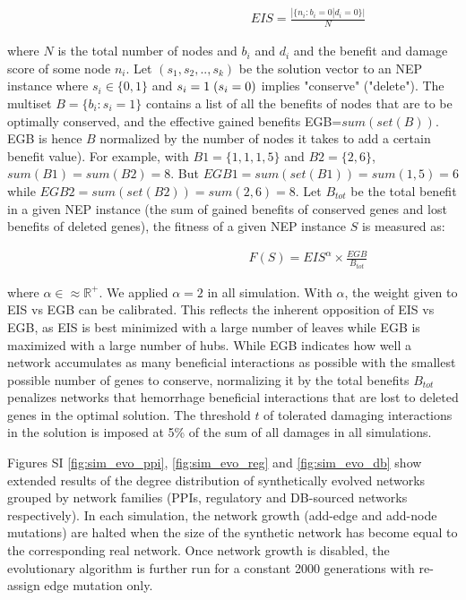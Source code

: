 \documentclass[12pt]{article}	%
\newcommand{\mys }{\hspace{0.1cm}}
\begin{document}
        \begin{align}
            \qquad\qquad\qquad\qquad\qquad\qquad EIS=\frac{|\{n_i:b_i=0|d_i=0\}|}{N}
        \end{align}


    \vspace{3mm}\noindent where $N$ is the total number of nodes and $b_i$ and $d_i$ and the benefit and damage score of some node $n_i$. Let $(s_1, s_2, .., s_k)$ be the solution vector to an NEP instance where $s_i\in\{0,1\}$  and $s_i=1 \mys (s_i=0)$ implies "conserve" ("delete"). The multiset $B=\{b_i: s_i=1\}$ contains a list of all the benefits of nodes that are to be optimally conserved, and the  effective gained benefits EGB=$sum(set(B))$.  EGB is hence $B$ normalized by the number of nodes it takes  to add a certain benefit value). For example, with
    $B1=\{1,1,1,5\}$
    and
    $B2=\{2,6\}$, $sum(B1)=sum(B2)=8$.
    But
    $EGB1 = sum(set(B1))=sum({1,5})= 6$
    while
    $EGB2 = sum(set(B2))=sum({2,6})=8$.
    Let $B_{tot}$ be the total benefit in a given NEP instance (the sum of gained benefits of conserved genes and lost benefits of deleted genes), the fitness of a given NEP instance $S$ is measured as:

        \begin{align}
            \qquad\qquad\qquad\qquad\qquad\qquad F(S) = EIS^\alpha \times \frac {EGB}{B_{tot}}
        \end{align}



    \vspace{3mm}\noindent where $\alpha\in \approx \mathbb{R}^{+}$. We applied $\alpha=2$ in all simulation. With  $\alpha$, the weight  given to EIS vs EGB can be calibrated. This reflects the inherent opposition of EIS vs EGB, as EIS is best minimized with a large number of leaves while EGB is maximized with a large number of hubs. While EGB indicates how well a network accumulates as many beneficial interactions as possible with the smallest possible number of genes to conserve, normalizing it by the total benefits $B_{tot}$ penalizes networks that hemorrhage beneficial interactions that are lost to deleted genes in the optimal solution. The threshold $t$ of tolerated damaging interactions in the solution is imposed at 5\% of the sum of all damages in all simulations.


    Figures SI \ref{fig:sim_evo_ppi}, \ref{fig:sim_evo_reg} and \ref{fig:sim_evo_db} show extended results of the degree distribution of synthetically evolved networks grouped by network families (PPIs, regulatory and DB-sourced networks respectively). In each simulation, the network growth (add-edge and add-node mutations) are halted when the size of the synthetic network has become equal to the corresponding real network. Once network growth is disabled, the evolutionary algorithm is further run for a constant 2000 generations with re-assign edge mutation only.
\end{document}

